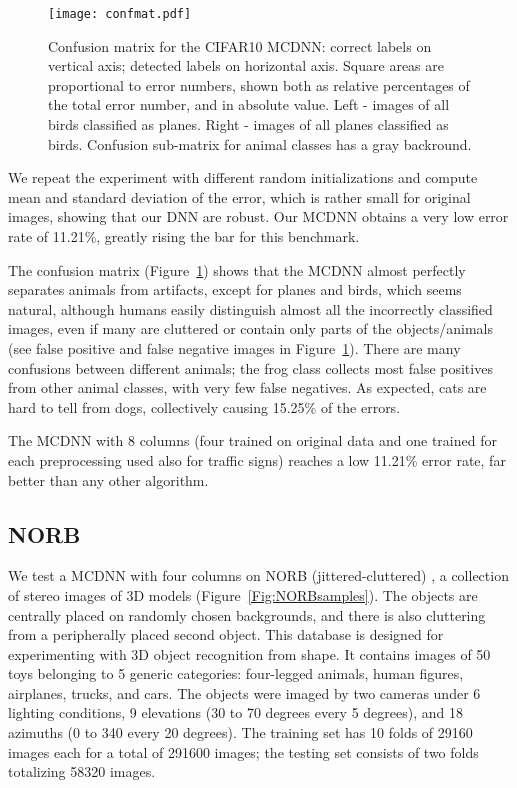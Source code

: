 \documentclass[a4paper]{article}
\begin{document}
\begin{figure}[ht!]
\hfill
\begin{center}
\texttt{[image: confmat.pdf]}
\end{center}
\caption{Confusion matrix for the CIFAR10 MCDNN: correct labels on vertical axis; detected labels on horizontal axis. Square areas are proportional to error numbers, shown both as relative percentages of the total error number, and in absolute value. Left - images of all birds classified as planes. Right - images of all planes classified as birds. Confusion sub-matrix for animal classes has a gray backround.}
\label{Fig:CIFAR10confmat}
\end{figure}

We repeat the experiment with different random initializations and compute mean and standard deviation of the error, which is rather small for original images, showing that our DNN are robust. Our MCDNN obtains a very low error rate of 11.21\%, greatly rising the bar for this benchmark.

The confusion matrix (Figure~\ref{Fig:CIFAR10confmat}) shows that the MCDNN almost perfectly separates animals from artifacts, except for planes and birds, which seems natural, although humans easily distinguish almost all the incorrectly classified images, even if many are cluttered or contain only parts of the objects/animals  (see false positive and false negative images in Figure~\ref{Fig:CIFAR10confmat}). There are many confusions between different animals; the frog class collects most false positives from other animal classes, with very few false negatives. As expected, cats are hard to tell from dogs, collectively causing 15.25\% of the errors.

The MCDNN with 8 columns (four trained on original data and one trained for each preprocessing used also for traffic signs) reaches a low 11.21\% error rate, far better than any other algorithm.

\subsection{NORB}
We test a MCDNN with four columns on NORB (jittered-cluttered) \cite{lecun:2004}, a collection of stereo images of 3D models (Figure~\ref{Fig:NORBsamples}). The objects are centrally placed on randomly chosen backgrounds, and there is also cluttering from a peripherally placed second object. 
This database is designed for experimenting with 3D object recognition from shape. It contains images of 50 toys belonging to 5 generic categories: four-legged animals, human figures, airplanes, trucks, and cars. The objects were imaged by two cameras under 6 lighting conditions, 9 elevations (30 to 70 degrees every 5 degrees), and 18 azimuths (0 to 340 every 20 degrees). The training set has 10 folds of 29160 images each for a total of 291600 images; the testing set consists of two folds totalizing 58320 images.
\end{document}
